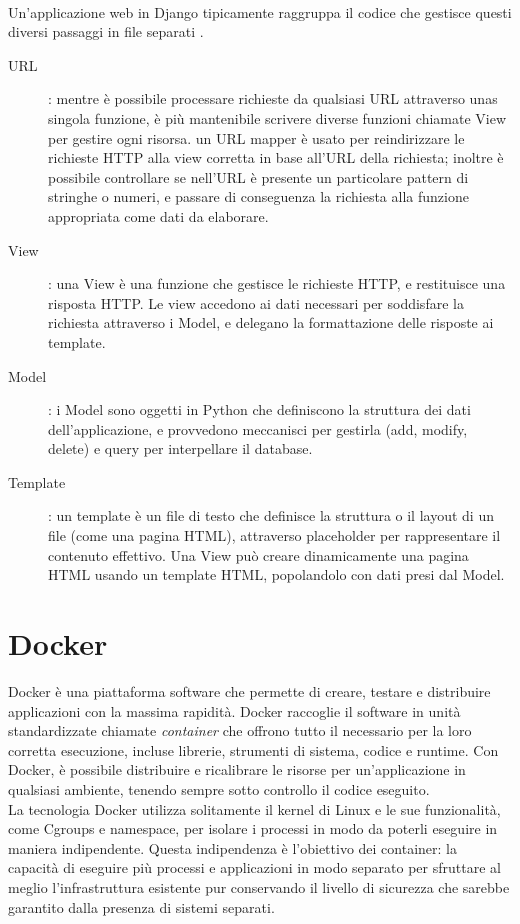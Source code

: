 \ \\
Un'applicazione web in Django tipicamente raggruppa il codice che gestisce questi diversi passaggi in file separati \cite{mdn-django-documentation}.
\begin{description}
	\item[URL]: mentre è possibile processare richieste da qualsiasi URL attraverso unas singola funzione, è più mantenibile scrivere diverse funzioni chiamate
	View per gestire ogni risorsa. un URL mapper è usato per reindirizzare le richieste HTTP alla view corretta in base all'URL della richiesta; inoltre è 
	possibile controllare se nell'URL è presente un particolare pattern di stringhe o numeri, e passare di conseguenza la richiesta alla funzione appropriata
	come dati da elaborare.
	\item[View]: una View è una funzione che gestisce le richieste HTTP, e restituisce una risposta HTTP. Le view accedono ai dati necessari per soddisfare la 
	richiesta attraverso i Model, e delegano la formattazione delle risposte ai template. 
	\item[Model]: i Model sono oggetti in Python che definiscono la struttura dei dati dell'applicazione, e provvedono meccanisci per gestirla (add, modify, 
	delete) e query per interpellare il database.
	\item[Template]: un template è un file di testo che definisce la struttura o il layout di un file (come una pagina HTML), attraverso placeholder per 
	rappresentare il contenuto effettivo. Una View può creare dinamicamente una pagina HTML usando un template HTML, popolandolo con dati presi dal Model. 
\end{description}

\section{Docker}
Docker è una piattaforma software che permette di creare, testare e distribuire applicazioni con la massima rapidità. Docker raccoglie 
il software in unità standardizzate chiamate \textit{container} che offrono tutto il necessario per la loro corretta esecuzione, incluse librerie, 
strumenti di sistema, codice e runtime. Con Docker, è possibile distribuire e ricalibrare le risorse per un'applicazione in qualsiasi ambiente, 
tenendo sempre sotto controllo il codice eseguito.\\
La tecnologia Docker utilizza solitamente il kernel di Linux e le sue funzionalità, come Cgroups e namespace, per isolare i processi in modo da poterli 
eseguire in maniera indipendente. Questa indipendenza è l'obiettivo dei container: la capacità di eseguire più processi e applicazioni in 
modo separato per sfruttare al meglio l'infrastruttura esistente pur conservando il livello di sicurezza che sarebbe garantito dalla 
presenza di sistemi separati.

